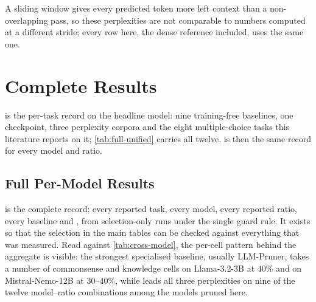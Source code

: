 A sliding window gives every predicted token more left context than a non-overlapping pass, so these
perplexities are not comparable to numbers computed at a different stride; every row here, the dense
reference included, uses the same one.

\section{Complete Results}
\label{app:results}
 is the per-task record on the headline model: nine training-free baselines, one
checkpoint, three perplexity corpora and the eight multiple-choice tasks this literature reports on it;
\cref{tab:full-unified} carries all twelve.  is then the same record for every
model and ratio.

\begin{table}[htbp]
\centering
\caption{\textbf{Per-task results on Llama-3.1-8B-Instruct at $20\%$}, full test sets.
 = best among pruned,  = second, so a baseline that beats us is marked where
it does. \textbf{Avg} is the seven-task commonsense mean, the set this literature reports under that
name. Every row is the same instruction-tuned checkpoint, and every row but one is selected under the
shared guard of \cref{app:protocol}; $^{\ddagger}$2SSP sets its own per-layer budget, because its two
stages \emph{are} the method (\cref{app:baselines}).}
\label{tab:main-8b}

\end{table}
\subsection{Full Per-Model Results}

\label{app:full-results}
 is the complete record: every reported task, every model, every reported
ratio, every baseline and \method, from selection-only runs under the single guard rule. It exists
so that the selection in the main tables can be checked against everything that was measured. Read
against
\cref{tab:cross-model}, the per-cell pattern behind the aggregate is visible: the strongest
specialised baseline, usually LLM-Pruner, takes a number of commonsense and knowledge cells on
Llama-3.2-3B at $40\%$ and on Mistral-Nemo-12B at $30$--$40\%$, while \method leads all three perplexities on nine of the
twelve model--ratio combinations among the models pruned here.

